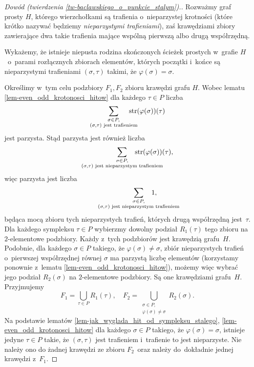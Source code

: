 \begin{proof}[Dowód (twierdzenia \ref{tw-baclawskiego_o_punkcie_stalym}).]
Rozważmy graf prosty $H$, którego wierzchołkami są trafienia o~nieparzystej krotności (które krótko nazywać będziemy \textit{nieparzystymi trafieniami}), zaś krawędziami zbiory zawierające dwa takie trafienia mające wspólną pierwszą albo drugą współrzędną.

Wykażemy, że istnieje niepusta rodzina skończonych ścieżek prostych w~grafie $H$~o~parami rozłącznych zbiorach elementów, których początki i~końce są nieparzystymi trafieniami $(\sigma,\tau)$ takimi, że $\varphi(\sigma)=\sigma$.

Określimy w~tym celu podzbiory $F_1, F_2$ zbioru krawędzi grafu $H$. Wobec lematu \ref{lem-even_odd_krotonosci_hitow} dla każdego $\tau\in P$ liczba \[\sum_{\substack{\sigma\in P,\\(\sigma,\tau)\text{ jest trafieniem}}}\hspace{-0.5cm}\str(\varphi(\sigma))(\tau)\] jest parzysta. Stąd parzysta jest również liczba \[\sum_{\substack{\sigma\in P,\\(\sigma,\tau)\text{ jest nieparzystym trafieniem}}}\hspace{-1.5cm}\str(\varphi(\sigma))(\tau),\]
więc parzysta jest liczba 
\[\sum_{\substack{\sigma\in P,\\(\sigma,\tau)\text{ jest nieparzystym trafieniem}}}\hspace{-1.5cm}1,\] będąca mocą zbioru tych nieparzystych trafień, których drugą współrzędną jest~$\tau$. Dla każdego sympleksu $\tau\in P$ wybierzmy dowolny podział $R_1(\tau)$ tego zbioru na \mbox{$2$-elementowe} podzbiory. Każdy z~tych podzbiorów jest krawędzią grafu~$H$. Podobnie, dla każdego $\sigma\in P$ takiego, że $\varphi(\sigma)\not=\sigma$, zbiór nieparzystych trafień o~pierwszej współrzędnej równej $\sigma$ ma parzystą liczbę elementów (korzystamy ponownie z~lematu \ref{lem-even_odd_krotonosci_hitow}), możemy więc wybrać jego podział $R_2(\sigma)$ na $2$-elementowe podzbiory. Są one krawędziami grafu~$H$.  Przyjmujemy \[F_1=\bigcup_{\tau\in P} R_1(\tau),\quad F_2=\bigcup_{\substack{\sigma\in P,\\ \varphi(\sigma)\not=\sigma}}R_2(\sigma).\]
Na podstawie lematów \ref{lem-jak_wyglada_hit_od_sympleksu_stalego}, \ref{lem-even_odd_krotonosci_hitow} dla każdego $\sigma\in P$ takiego, że $\varphi(\sigma)=\sigma$, istnieje jedyne $\tau\in P$ takie, że $(\sigma,\tau)$ jest trafieniem i~trafienie to jest nieparzyste. Nie należy ono do żadnej krawędzi ze zbioru $F_2$~oraz należy do~dokładnie jednej krawędzi z~$F_1$.


\end{proof}
